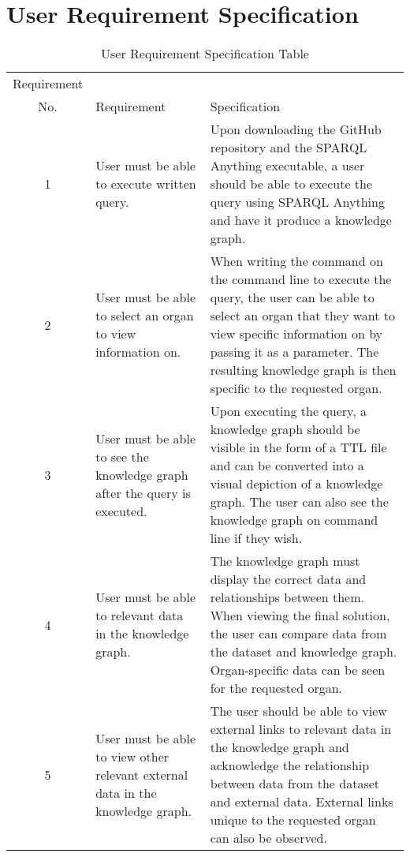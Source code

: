 \begin{table}[h!]
\section{User Requirement Specification}
\begin{center}
\begin{tabular}{c|p{2in}p{2.55in}}
Requirement \\ No.&Requirement&Specification\\\hline 

1&
User must be able to execute written query. & 
Upon downloading the GitHub repository and the SPARQL Anything executable, a user should be able to execute the query using SPARQL Anything and have it produce a knowledge graph. \\
\hline

2& 
User must be able to select an organ to view information on. &
When writing the command on the command line to execute the query, the user can be able to select an organ that they want to view specific information on by passing it as a parameter. The resulting knowledge graph is then specific to the requested organ. \\
\hline

3&
User must be able to see the knowledge graph after the query is executed. &
Upon executing the query, a knowledge graph should be visible in the form of a TTL file and can be converted into a visual depiction of a knowledge graph. The user can also see the knowledge graph on command line if they wish.\\
\hline

4&
User must be able to relevant data in the knowledge graph. & 
The knowledge graph must display the correct data and relationships between them. When viewing the final solution, the user can compare data from the dataset and knowledge graph. Organ-specific data can be seen for the requested organ.\\
\hline

5&
User must be able to view other relevant external data in the knowledge graph. & 
The user should be able to view external links to relevant data in the knowledge graph and acknowledge the relationship between data from the dataset and external data. External links unique to the requested organ can also be observed. 

\end{tabular}
\end{center}
\caption{User Requirement Specification Table}
\end{table}

